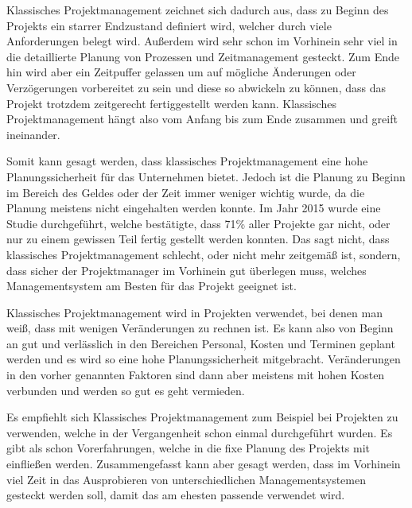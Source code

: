 

Klassisches Projektmanagement zeichnet sich dadurch aus, dass zu Beginn des Projekts ein starrer Endzustand definiert wird, welcher durch viele Anforderungen belegt wird. Außerdem wird sehr schon im Vorhinein sehr viel in die detaillierte Planung von Prozessen und Zeitmanagement gesteckt. Zum Ende hin wird aber ein Zeitpuffer gelassen um auf mögliche Änderungen oder Verzögerungen vorbereitet zu sein und diese so abwickeln zu können, dass das Projekt trotzdem zeitgerecht fertiggestellt werden kann. Klassisches Projektmanagement hängt also vom Anfang bis zum Ende zusammen und greift ineinander. 

Somit kann gesagt werden, dass klassisches Projektmanagement eine hohe Planungssicherheit für das Unternehmen bietet. Jedoch ist die Planung zu Beginn im Bereich des Geldes oder der Zeit immer weniger wichtig wurde, da die Planung meistens nicht eingehalten werden konnte. Im Jahr 2015 wurde eine Studie durchgeführt, welche bestätigte, dass 71\% aller Projekte gar nicht, oder nur zu einem gewissen Teil fertig gestellt werden konnten. Das sagt nicht, dass klassisches Projektmanagement schlecht, oder nicht mehr zeitgemäß ist, sondern, dass sicher der Projektmanager im Vorhinein gut überlegen muss, welches Managementsystem am Besten für das Projekt geeignet ist.  \cite{Projectman.}


Klassisches Projektmanagement wird in Projekten verwendet, bei denen man weiß, dass mit wenigen Veränderungen zu rechnen ist. Es kann also von Beginn an gut und verlässlich in den Bereichen Personal, Kosten und Terminen geplant werden und es wird so eine hohe Planungssicherheit mitgebracht. Veränderungen in den vorher genannten Faktoren sind dann aber meistens mit hohen Kosten verbunden und werden so gut es geht vermieden.

Es empfiehlt sich Klassisches Projektmanagement zum Beispiel bei Projekten zu verwenden, welche in der Vergangenheit schon einmal durchgeführt wurden. Es gibt als schon Vorerfahrungen, welche in die fixe Planung des Projekts mit einfließen werden. Zusammengefasst kann aber gesagt werden, dass im Vorhinein viel Zeit in das Ausprobieren von unterschiedlichen Managementsystemen gesteckt werden soll, damit das am ehesten passende verwendet wird. \cite{Projectman.}


